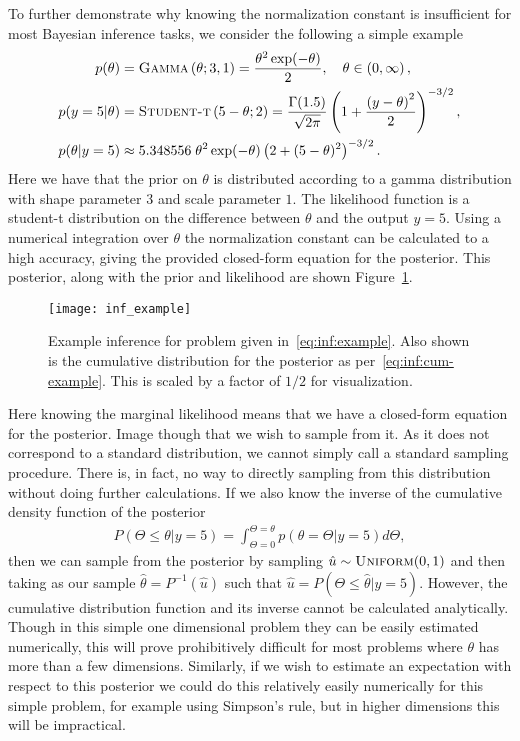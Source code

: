 To further demonstrate why knowing the normalization constant is insufficient
for most Bayesian inference tasks, we consider the following a simple example
\begin{subequations}
\label{eq:inf:example}
\begin{align}
p(\theta) &= \textsc{Gamma}\left(\theta; 3, 1\right) = \frac{\theta^2 \exp(-\theta)}{2},
 \quad \theta\in\left(0,\infty\right), \\
p(y=5|\theta) &= \textsc{Student-t}\left(5-\theta;2\right) = 
\frac{\Gamma (1.5)}{\sqrt{2\pi}}\left(1+\frac{\left(y-\theta\right)^2}{2}\right)^{-3/2}, \\
p(\theta |y=5) &\approx 5.348556 \; \theta^2
	 \exp(-\theta)\left(2+(5-\theta)^2\right)^{-3/2}\label{eq:inf:example-post}.
\end{align}
\end{subequations}
Here we have that the prior on $\theta$ is distributed according to a gamma
distribution with shape parameter $3$ and scale parameter $1$.  The likelihood
function is a student-t distribution on the difference between $\theta$ and the
output $y=5$.  Using a numerical integration over $\theta$ the normalization
constant can be calculated to a high accuracy, giving the provided closed-form
equation for the posterior.  This posterior, along with the prior and likelihood are shown Figure~\ref{fig:inf:inf-example}.

\begin{figure}[t]
	\centering
	\texttt{[image: inf\_example]}
	\caption{Example inference for problem given
		in~\eqref{eq:inf:example}. Also shown is the cumulative distribution for
		the posterior as per~\eqref{eq:inf:cum-example}.  This is scaled by a factor
		of $1/2$ for visualization.  \label{fig:inf:inf-example}}
\end{figure}

Here knowing the marginal likelihood means that we have a 
closed-form equation for the posterior.  Image though that we 
wish to sample from it.  As it does not correspond to a standard distribution,
we cannot simply call a standard sampling procedure.  There is, in fact, no way
to directly sampling from this distribution without doing further calculations.  If
we also know the inverse of the cumulative density function of the posterior
\begin{align}
\label{eq:inf:cum-example}
P(\Theta\le\theta | y=5) = \int_{\Theta=0}^{\Theta=\theta}  p(\theta=\Theta | y=5) d\Theta,
\end{align}
then we can sample from the posterior by sampling $\hat{u} \sim \textsc{Uniform}(0,1)$ and
then taking as our sample $\hat{\theta} = P^{-1}(\hat{u})$ such that 
$\hat{u} = P(\Theta\le\hat{\theta} | y=5)$.  However, the cumulative distribution function
and its inverse cannot be calculated analytically.  Though in this simple one dimensional
problem they can be easily estimated numerically, this will prove prohibitively difficult
for most problems where $\theta$ has more than a few dimensions.  Similarly, if we
wish to estimate an expectation with respect to this posterior we could do this relatively
easily numerically for this simple problem, for example using Simpson's rule, but in higher
dimensions this will be impractical.

